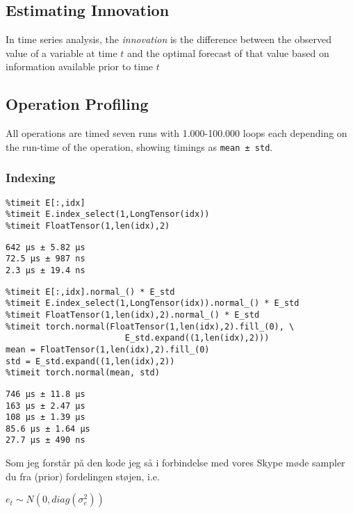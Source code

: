     \subsection{Estimating Innovation}
    
        In time series analysis, the \emph{innovation} is the difference between the observed value of a variable at time $t$ and the optimal forecast of that value based on information available prior to time $t$
            
    \subsection{Operation Profiling}
    
        All operations are timed seven runs with 1.000-100.000 loops each depending on the run-time of the operation, showing timings as \verb|mean ± std|.
    
        \subsubsection{Indexing}
        
        \begin{verbatim}
%timeit E[:,idx]
%timeit E.index_select(1,LongTensor(idx))
%timeit FloatTensor(1,len(idx),2)
        \end{verbatim}
        \begin{verbatim}
642 µs ± 5.82 µs
72.5 µs ± 987 ns
2.3 µs ± 19.4 ns
        \end{verbatim}
        
        
        \begin{verbatim}
%timeit E[:,idx].normal_() * E_std
%timeit E.index_select(1,LongTensor(idx)).normal_() * E_std
%timeit FloatTensor(1,len(idx),2).normal_() * E_std
%timeit torch.normal(FloatTensor(1,len(idx),2).fill_(0), \
                        E_std.expand((1,len(idx),2)))
mean = FloatTensor(1,len(idx),2).fill_(0)
std = E_std.expand((1,len(idx),2))
%timeit torch.normal(mean, std)
        \end{verbatim}
        \begin{verbatim}
746 µs ± 11.8 µs
163 µs ± 2.47 µs
108 µs ± 1.39 µs
85.6 µs ± 1.64 µs
27.7 µs ± 490 ns
        \end{verbatim}
        
    
Som jeg forstår på den kode jeg så i forbindelse med vores Skype møde sampler du fra  (prior) fordelingen støjen, i.e.


$e_t\sim N(0,diag(\sigma^2_e))$

